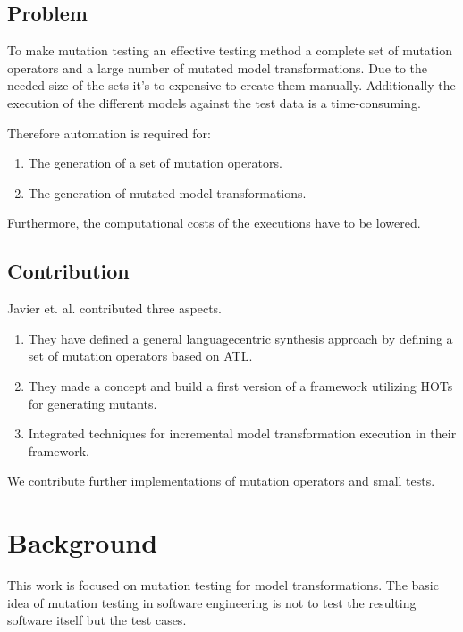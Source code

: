 \documentclass{llncs}
\begin{document}
\subsection{Problem}

To make mutation testing an effective testing method a complete set of mutation operators and a large number of mutated model transformations. Due to the needed size of the sets it's to expensive to create them manually. Additionally the execution of the different models against the test data is a time-consuming.

Therefore automation is required for:

\begin{enumerate}
	\item The generation of a set of mutation operators.
	\item The generation of mutated model transformations.
\end{enumerate}

Furthermore, the computational costs of the executions have to be lowered.

\subsection{Contribution}

Javier et. al. contributed three aspects.

\begin{enumerate}
	\item They have defined a general languagecentric synthesis approach by defining a set of mutation operators based on ATL. 
	\item They made a concept and build a first version of a framework utilizing HOTs for generating mutants.\cite{Paige:2009}
	\item Integrated techniques\cite{Bergmayr:2014} for incremental model transformation execution in their framework.
\end{enumerate}

We contribute further implementations of mutation operators and small tests.

\section{Background}

This work is focused on mutation testing for model transformations. The basic idea of mutation testing in software engineering is not to test the resulting software itself but the test cases.
\end{document}
